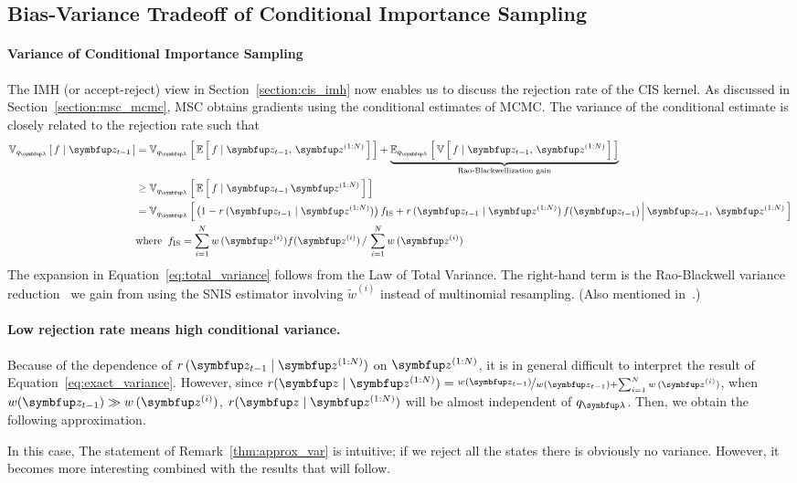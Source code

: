 \subsection{Bias-Variance Tradeoff of Conditional Importance Sampling}\label{section:bias_variance}
\paragraph{Variance of Conditional Importance Sampling}
The IMH (or accept-reject) view in Section~\ref{section:cis_imh} now enables us to discuss the rejection rate of the CIS kernel.
As discussed in Section~\ref{section:msc_mcmc}, MSC obtains gradients using the conditional estimates of MCMC.
The variance of the conditional estimate is closely related to the rejection rate such that
\begin{align}
  \Vsub{q_{\vlambda}}{f \mid \vz_{t-1}} &= \Vsub{q_{\vlambda}}{ \E{ f \mid \vz_{t-1},\,\vz^{(1:N)} } } + \underbrace{\Esub{q_{\vlambda}}{ \V{ f \mid \vz_{t-1},\,\vz^{(1:N)} } }}_{\text{Rao-Blackwellization gain}} \label{eq:total_variance} \\
  &\geq \Vsub{q_{\vlambda}}{ \E{ f \mid \vz_{t-1}\,\vz^{(1:N)} } } \\
  &= \Vsub{q_{\vlambda}}{ \big(1 - r\,(\vz_{t-1}\mid\vz^{(1:N)})\big)\, f_{\mathrm{IS}}
    + r\,(\vz_{t-1}\mid\vz^{(1:N)})\,f(\vz_{t-1}) \,\middle\vert\, \vz_{t-1},\, \vz^{(1:N)} } \label{eq:exact_variance} \\
  &\text{where}\;\; f_{\mathrm{IS}} = {\sum_{i=1}^N w\,(\vz^{(i)}) f(\vz^{(i)})\,/\,\sum_{i=1}^N w\,(\vz^{(i)})} \nonumber 
\end{align}
%
The expansion in Equation~\eqref{eq:total_variance} follows from the Law of Total Variance.
The right-hand term is the Rao-Blackwell variance reduction~\citep{bernton_locally_2015} we gain from using the SNIS estimator involving \(\widetilde{w}^{(i)}\) instead of multinomial resampling. (Also mentioned in~\citet{NEURIPS2020_b2070693}.)

\paragraph{Low rejection rate means high conditional variance.}
Because of the dependence of \(r\,(\vz_{t-1}\mid\vz^{(1:N)})\) on \(\vz^{(1:N)}\), it is in general difficult to interpret the result of Equation~\eqref{eq:exact_variance}.
However, since \(r(\vz\mid\vz^{(1:N)}) = \nicefrac{w(\vz_{t-1})}{w(\vz_{t-1}) + \sum_{i=1}^N w\,(\vz^{(i)})}\), when \(w(\vz_{t-1}) \gg w\,(\vz^{(i)})\), \(r(\vz\mid\vz^{(1:N)})\) will be almost independent of \(q_{\vlambda}\).
Then, we obtain the following approximation.
%

%
In this case, 
The statement of Remark~\ref{thm:approx_var} is intuitive; if we reject all the states there is obviously no variance.
However, it becomes more interesting combined with the results that will follow.

